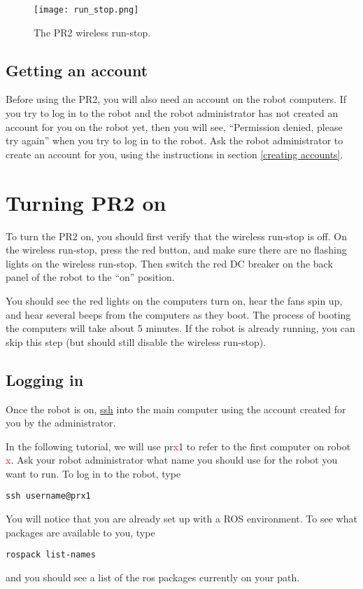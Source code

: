 \begin{figure}[h]
\centering
\texttt{[image: run\_stop.png]}
\caption{The PR2 wireless run-stop.}
\label{fig:runstop}
\end{figure}

\subsection{Getting an account}
Before using the PR2, you will also need an account on the robot computers.  If you try to log in to the robot and the robot administrator has not created an account for you on the robot yet, then you will see, ``Permission denied, please try again'' when you try to log in to the robot. Ask the robot administrator to create an account for you, using the instructions in section \ref{creating accounts}.
\section{Turning PR2 on}
To turn the PR2 on, you should first verify that the wireless run-stop is off. On the wireless run-stop, press the red button, and make sure there are no flashing lights on the wireless run-stop. Then switch the red DC breaker on the back panel of the robot to the ``on'' position.  


You should see the red lights on the computers turn on, hear the fans spin up, and hear several beeps from the computers as they boot.  The process of booting the computers will take about 5 minutes.  If the robot is already running, you can skip this step (but should still disable the wireless run-stop).
\subsection{Logging in}
Once the robot is on, \href{http://unixhelp.ed.ac.uk/CGI/man-cgi?ssh}{ssh} into the main computer using the account created for you by the administrator. 

In the following tutorial, we will use pr\textcolor{red}{x}1 to refer to the first computer on robot \textcolor{red}{x}.  Ask your robot  administrator what name you should use for the robot you want to run. To log in to the robot, type
\begin{verbatim}
ssh username@prx1
\end{verbatim}
You will notice that you are already set up with a ROS environment.  To see what packages are available to you, type
\begin{verbatim}
rospack list-names
\end{verbatim}
and you should see a list of the ros packages currently on your path.

